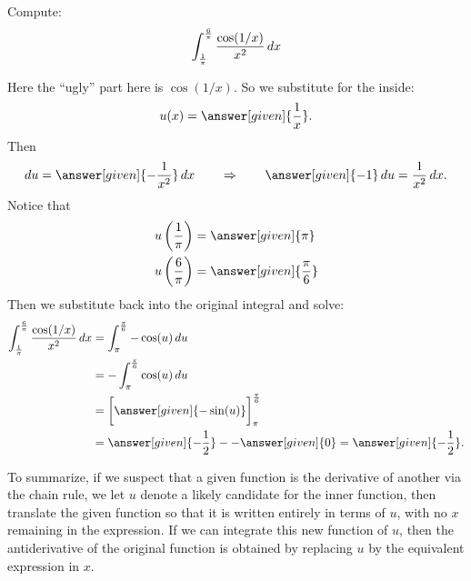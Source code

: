 \documentclass{ximera}
\begin{document}
\begin{example}
  Compute:
  \[
  \int_{\frac{1}{\pi}}^{{\frac{6}{\pi}}} \frac{\cos(1/x)}{x^2} \mathop{}\!d x
  \]
\begin{explanation}
Here the ``ugly'' part here is $\cos(1/x)$.  So we substitute for
the inside:
\[
u(x)=\answer[given]{\frac{1}{x}}.
\]
Then
\[
\d u =  \answer[given]{-\frac{1}{x^2}} \d x 	\qquad	\Rightarrow	\qquad	\answer[given]{-1} \d u = \frac{1}{x^2}\d x.
\]
Notice that
\begin{align*}
u\left(\frac{1}{\pi}\right) &= \answer[given]{\pi} \\
u\left(\frac{6}{\pi}\right) &= \answer[given]{\frac{\pi}{6}} \\
\end{align*}
Then we substitute back into the original integral and solve:
\begin{align*}
\int_{\frac{1}{\pi}}^{\frac{6}{\pi}} \frac{\cos(1/x)}{x^2} \d x &= \int_{\pi}^{\frac{\pi}{6}} -\cos(u) \d u  \\
&= -\int_\pi^{\frac{\pi}{6}} \cos(u) \d u  \\
&= \eval{\answer[given]{-\sin(u)}}_{\pi}^{\frac{\pi}{6}}  \\
&= \answer[given]{-\frac{1}{2}} - -\answer[given]{0} = \answer[given]{-\frac{1}{2}}.
\end{align*}
\end{explanation}
\end{example}

To summarize, if we suspect that a given function is the derivative of
another via the chain rule, we let $u$ denote a likely candidate for
the inner function, then translate the given function so that it is
written entirely in terms of $u$, with no $x$ remaining in the
expression. If we can integrate this new function of $u$, then the
antiderivative of the original function is obtained by replacing $u$
by the equivalent expression in $x$.
\end{document}

